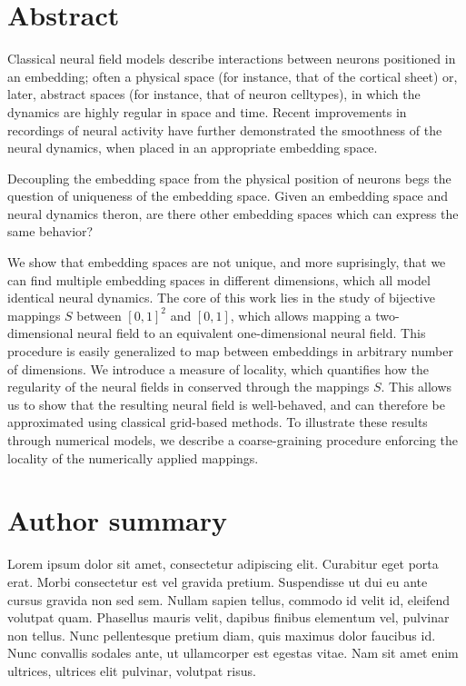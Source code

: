 \documentclass[10pt,letterpaper]{article}
\begin{document}
\section*{Abstract}
Classical neural field models describe interactions between neurons positioned in an embedding; often a physical space (for instance, that of the cortical sheet) or, later, abstract spaces (for instance, that of neuron celltypes), in which the dynamics are highly regular in space and time. Recent improvements in recordings of neural activity have further demonstrated the smoothness of the neural dynamics, when placed in an appropriate embedding space.

Decoupling the embedding space from the physical position of neurons begs the question of uniqueness of the embedding space. Given an embedding space and neural dynamics theron, are there other embedding spaces which can express the same behavior?

We show that embedding spaces are not unique, and more suprisingly, that we can find multiple embedding spaces in different dimensions, which all model identical neural dynamics.
The core of this work lies in the study of bijective mappings $S$ between $[0,1]^2$ and $[0,1]$, which allows mapping a two-dimensional neural field to an equivalent one-dimensional neural field.
This procedure is easily generalized to map between embeddings in arbitrary number of dimensions.
We introduce a measure of locality, which quantifies how the regularity of the neural fields in conserved through the mappings $S$. This allows us to show that the resulting neural field is well-behaved, and can therefore be approximated using classical grid-based methods.
To illustrate these results through numerical models, we describe a coarse-graining procedure enforcing the locality of the numerically applied mappings.


\section*{Author summary}
Lorem ipsum dolor sit amet, consectetur adipiscing elit. Curabitur eget porta erat. Morbi consectetur est vel gravida pretium. Suspendisse ut dui eu ante cursus gravida non sed sem. Nullam sapien tellus, commodo id velit id, eleifend volutpat quam. Phasellus mauris velit, dapibus finibus elementum vel, pulvinar non tellus. Nunc pellentesque pretium diam, quis maximus dolor faucibus id. Nunc convallis sodales ante, ut ullamcorper est egestas vitae. Nam sit amet enim ultrices, ultrices elit pulvinar, volutpat risus.
\end{document}
